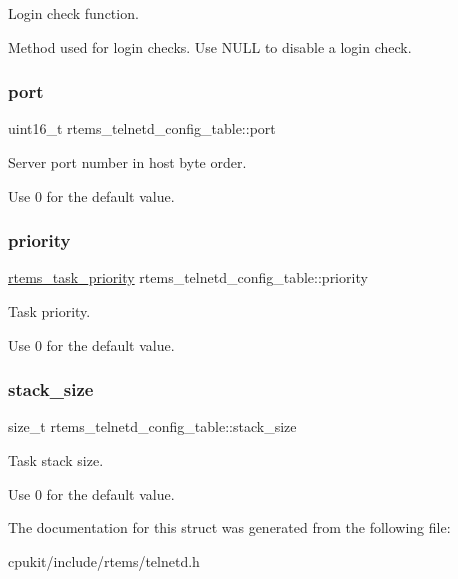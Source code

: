 Login check function. 

Method used for login checks. Use {\ttfamily N\+U\+LL} to disable a login check. \mbox{\label{structrtems__telnetd__config__table_a12b0c10773d3db11aadf52943614e899}} 
\subsubsection{\texorpdfstring{port}{port}}
{\footnotesize\ttfamily uint16\+\_\+t rtems\+\_\+telnetd\+\_\+config\+\_\+table\+::port}



Server port number in host byte order. 

Use 0 for the default value. \mbox{\label{structrtems__telnetd__config__table_afc49c654a03598318272c5eb028a07cb}} 
\subsubsection{\texorpdfstring{priority}{priority}}
{\footnotesize\ttfamily \mbox{\hyperlink{group__ClassicTasks_gaa80a0c0938307d1e99d0eb5fee765b47}{rtems\+\_\+task\+\_\+priority}} rtems\+\_\+telnetd\+\_\+config\+\_\+table\+::priority}



Task priority. 

Use 0 for the default value. \mbox{\label{structrtems__telnetd__config__table_a2aa8eb79f53b8ef08d330acafa446c75}} 
\subsubsection{\texorpdfstring{stack\_size}{stack\_size}}
{\footnotesize\ttfamily size\+\_\+t rtems\+\_\+telnetd\+\_\+config\+\_\+table\+::stack\+\_\+size}



Task stack size. 

Use 0 for the default value. 

The documentation for this struct was generated from the following file\+:\begin{DoxyCompactItemize}
\item 
cpukit/include/rtems/telnetd.\+h\end{DoxyCompactItemize}
